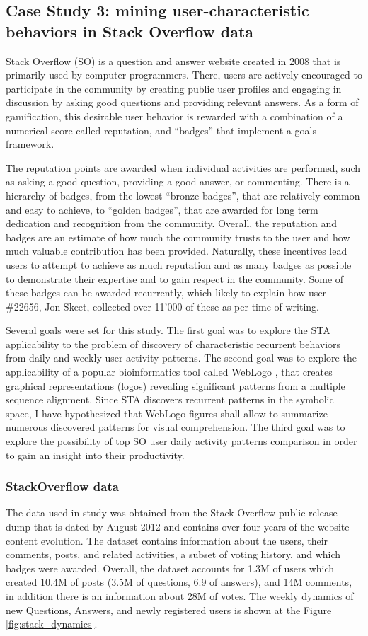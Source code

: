 \subsection{Case Study 3: mining user-characteristic behaviors in Stack Overflow data}\label{case3}
Stack Overflow (SO) is a question and answer website created in 2008 that is primarily used by computer programmers. There, users are actively encouraged to participate in the community by creating public user profiles and engaging in discussion by asking good questions and providing relevant answers. As a form of gamification, this desirable user behavior is rewarded with a combination of a numerical score called reputation, and ``badges'' that implement a goals framework. 

The reputation points are awarded when individual activities are performed, such as asking a good question, providing a good answer, or commenting. There is a hierarchy of badges, from the lowest ``bronze badges'', that are relatively common and easy to achieve, to ``golden badges'', that are awarded for long term dedication and recognition from the community. Overall, the reputation and badges are an estimate of how much the community trusts to the user and how much valuable contribution has been provided. Naturally, these incentives lead users to attempt to achieve as much reputation and as many badges as possible to demonstrate their expertise and to gain respect in the community. Some of these badges can be awarded recurrently, which likely to explain how user \#22656, Jon Skeet, collected over 11'000 of these as per time of writing.

Several goals were set for this study. The first goal was to explore the STA applicability to the problem of discovery of characteristic recurrent behaviors from daily and weekly user activity patterns. The second goal was to explore the applicability of a popular bioinformatics tool called WebLogo \cite{weblogo}, that creates graphical representations (logos) revealing significant patterns from a multiple sequence alignment. Since STA discovers recurrent patterns in the symbolic space, I have hypothesized that WebLogo figures shall allow to summarize numerous discovered patterns for visual comprehension. The third goal was to explore the possibility of top SO user daily activity patterns comparison in order to gain an insight into their productivity. 

\subsubsection{StackOverflow data}
The data used in study was obtained from the Stack Overflow public release dump that is dated by August 2012 and contains over four years of the website content evolution. The dataset contains information about the users, their comments, posts, and related activities, a subset of voting history, and which badges were awarded.  Overall, the dataset accounts for 1.3M of users which created 10.4M of posts (3.5M of questions, 6.9 of answers), and 14M comments, in addition there is an information about 28M of votes. The weekly dynamics of new Questions, Answers, and newly registered users is shown at the Figure \ref{fig:stack_dynamics}.

